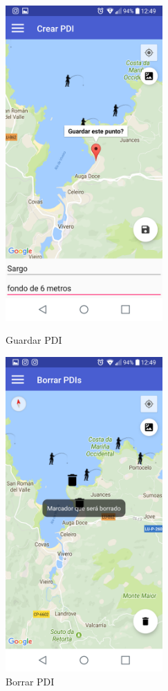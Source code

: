 \begin{figure}[htbp]
\begin{minipage}[b]{0.5\linewidth} %
\centering
\includegraphics[width=6cm]{capturamovil/pdiguardar.png}

\caption{Guardar PDI}
\label{fig:pdiguardar}
\end{minipage}
\hspace{0.5cm} %
\begin{minipage}[b]{0.5\linewidth}
\centering
\includegraphics[width=6cm]{capturamovil/pdiborrar.png}

\caption{Borrar PDI }
\label{fig:pdiborrar}
\end{minipage}
\end{figure}

